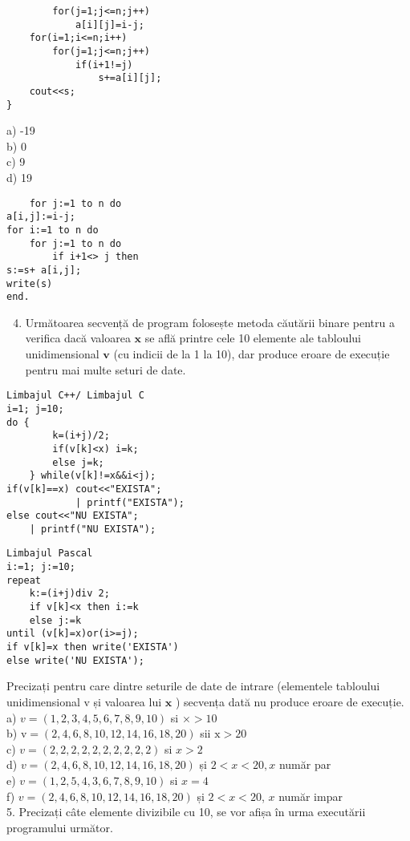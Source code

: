\begin{verbatim}
        for(j=1;j<=n;j++)
            a[i][j]=i-j;
    for(i=1;i<=n;i++)
        for(j=1;j<=n;j++)
            if(i+1!=j)
                s+=a[i][j];
    cout<<s;
}
\end{verbatim}

a) -19\\
b) 0\\
c) 9\\
d) 19

\begin{verbatim}
    for j:=1 to n do
a[i,j]:=i-j;
for i:=1 to n do
    for j:=1 to n do
        if i+1<> j then
s:=s+ a[i,j];
write(s)
end.
\end{verbatim}

\begin{enumerate}
  \setcounter{enumi}{3}
  \item Următoarea secvență de program folosește metoda căutării binare pentru a verifica dacă valoarea $\mathbf{x}$ se află printre cele 10 elemente ale tabloului unidimensional $\mathbf{v}$ (cu indicii de la 1 la 10), dar produce eroare de execuție pentru mai multe seturi de date.
\end{enumerate}

\begin{verbatim}
Limbajul C++/ Limbajul C
i=1; j=10;
do {
        k=(i+j)/2;
        if(v[k]<x) i=k;
        else j=k;
    } while(v[k]!=x&&i<j);
if(v[k]==x) cout<<"EXISTA";
            | printf("EXISTA");
else cout<<"NU EXISTA";
    | printf("NU EXISTA");
\end{verbatim}

\begin{verbatim}
Limbajul Pascal
i:=1; j:=10;
repeat
    k:=(i+j)div 2;
    if v[k]<x then i:=k
    else j:=k
until (v[k]=x)or(i>=j);
if v[k]=x then write('EXISTA')
else write('NU EXISTA');
\end{verbatim}

Precizați pentru care dintre seturile de date de intrare (elementele tabloului unidimensional v și valoarea lui $\mathbf{x}$ ) secvența dată nu produce eroare de execuție.\\
a) $v=(1,2,3,4,5,6,7,8,9,10)$ si $\times>10$\\
b) $\mathrm{v}=(2,4,6,8,10,12,14,16,18,20)$ sii $\mathrm{x}>20$\\
c) $v=(2,2,2,2,2,2,2,2,2,2)$ si $x>2$\\
d) $v=(2,4,6,8,10,12,14,16,18,20)$ și $2<x<20, x$ număr par\\
e) $v=(1,2,5,4,3,6,7,8,9,10)$ si $x=4$\\
f) $v=(2,4,6,8,10,12,14,16,18,20)$ și $2<x<20$, $x$ număr impar\\
5. Precizați câte elemente divizibile cu 10, se vor afișa în urma executării programului următor.

